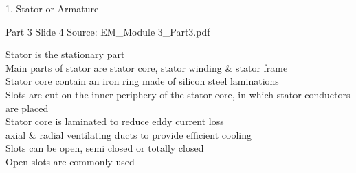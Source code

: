 \documentclass[11pt,a4paper]{article}
\begin{document}
\begin{mdframed}[roundcorner=9pt,backgroundcolor=white,linecolor=anthOrange,linewidth=1pt,innerleftmargin=12pt,innerrightmargin=12pt,innertopmargin=10pt,innerbottommargin=10pt,skipabove=8pt,skipbelow=10pt]
{\HeadingFont\fontsize{15}{18}\selectfont\color{anthDark}1. Stator or Armature\par}
{\color{anthMid}\small Part 3 \textbullet{} Slide 4 \textbullet{} Source: EM\_Module 3\_Part3.pdf\par}
\vspace{0.5em}
{\small
\textcolor{anthOrange}{\textbullet}\hspace{0.65em}Stator is the stationary part\\
\textcolor{anthOrange}{\textbullet}\hspace{0.65em}Main parts of stator are stator core, stator winding \& stator frame\\
\textcolor{anthOrange}{\textbullet}\hspace{0.65em}Stator core contain an iron ring made of silicon steel laminations\\
\textcolor{anthOrange}{\textbullet}\hspace{0.65em}Slots are cut on the inner periphery of the stator core, in which stator conductors are placed\\
\textcolor{anthOrange}{\textbullet}\hspace{0.65em}Stator core is laminated to reduce eddy current loss\\
\textcolor{anthOrange}{\textbullet}\hspace{0.65em}axial \& radial ventilating ducts to provide efficient cooling\\
\textcolor{anthOrange}{\textbullet}\hspace{0.65em}Slots can be open, semi closed or totally closed\\
\textcolor{anthOrange}{\textbullet}\hspace{0.65em}Open slots are commonly used\\

}
\end{mdframed}
\end{document}
